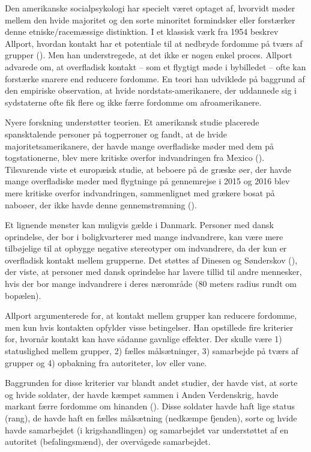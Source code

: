 \documentclass[
]{book}
\begin{document}
Den amerikanske socialpsykologi har specielt været optaget af, hvorvidt møder mellem den hvide majoritet og den sorte minoritet formindsker eller forstærker denne etniske/racemæssige distinktion. I et klassisk værk fra 1954 beskrev Allport, hvordan kontakt har et potentiale til at nedbryde fordomme på tværs af grupper (). Men han understregede, at det ikke er nogen enkel proces. Allport advarede om, at overfladisk kontakt -- som et flygtigt møde i bybilledet -- ofte kan forstærke snarere end reducere fordomme. En teori han udviklede på baggrund af den empiriske observation, at hvide nordstats-amerikanere, der uddannede sig i sydstaterne ofte fik flere og ikke færre fordomme om afroamerikanere.

Nyere forskning understøtter teorien. Et amerikansk studie placerede spansktalende personer på togperroner og fandt, at de hvide majoritetsamerikanere, der havde mange overfladiske møder med dem på togstationerne, blev mere kritiske overfor indvandringen fra Mexico (). Tilsvarende viste et europæisk studie, at beboere på de græske øer, der havde mange overfladiske møder med flygtninge på gennemrejse i 2015 og 2016 blev mere kritiske overfor indvandringen, sammenlignet med grækere bosat på naboøer, der ikke havde denne gennemstrømning ().

Et lignende mønster kan muligvis gælde i Danmark. Personer med dansk oprindelse, der bor i boligkvarterer med mange indvandrere, kan være mere tilbøjelige til at opbygge negative stereotyper om indvandrere, da der kun er overfladisk kontakt mellem grupperne. Det støttes af Dinesen og Sønderskov (), der viste, at personer med dansk oprindelse har lavere tillid til andre mennesker, hvis der bor mange indvandrere i deres nærområde (80 meters radius rundt om bopælen).

Allport argumenterede for, at kontakt mellem grupper kan reducere fordomme, men kun hvis kontakten opfylder visse betingelser. Han opstillede fire kriterier for, hvornår kontakt kan have sådanne gavnlige effekter. Der skulle være 1) statuslighed mellem grupper, 2) fælles målsætninger, 3) samarbejde på tværs af grupper og 4) opbakning fra autoriteter, lov eller vane.

Baggrunden for disse kriterier var blandt andet studier, der havde vist, at sorte og hvide soldater, der havde kæmpet sammen i Anden Verdenskrig, havde markant færre fordomme om hinanden (). Disse soldater havde haft lige status (rang), de havde haft en fælles målsætning (nedkæmpe fjenden), sorte og hvide havde samarbejdet (i krigshandlingen) og samarbejdet var understøttet af en autoritet (befalingsmænd), der overvågede samarbejdet.
\end{document}
